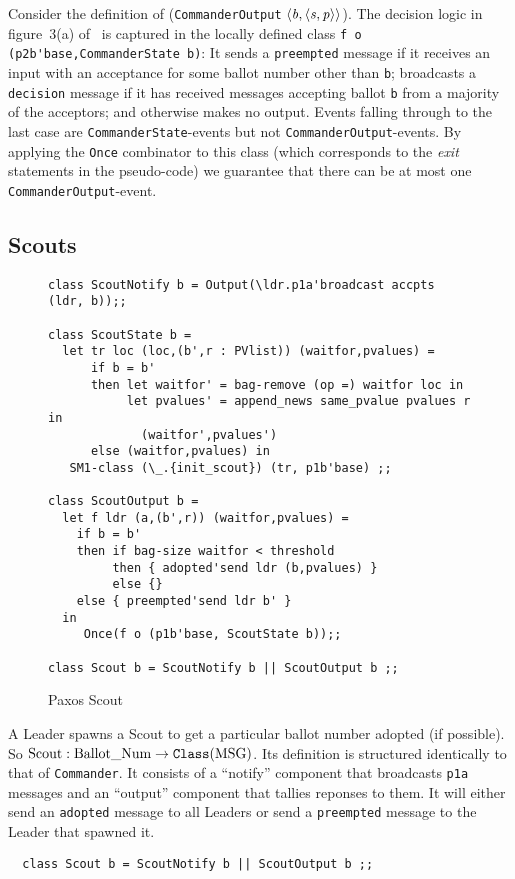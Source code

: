 \documentclass[final]{article}
\newcommand{\listinline}[1]{\text{\lstinline{#1}}}
\newcommand{\bsp}{\mbox{$\NUPRLpair{\NUPRL{b}}{\NUPRLpair{\NUPRL{s}}{\NUPRL{p}}}$}}
\begin{document}
Consider the definition of (\lstinline{CommanderOutput} \bsp).  The
decision logic in figure~3(a) of~\cite{VanRenesse:2011} is captured in
the locally defined class \lstinline{f o (p2b'base,CommanderState b)}:
It sends a \lstinline{preempted} message if it receives an input with
an acceptance for some ballot number other than \lstinline{b};
broadcasts a \lstinline{decision} message if it has received messages
accepting ballot \lstinline{b} from a majority of the acceptors; and
otherwise makes no output.  Events falling through to the last case
are \lstinline{CommanderState}-events but not
\lstinline{CommanderOutput}-events.  By applying the \lstinline{Once}
combinator to this class (which corresponds to the \emph{exit}
statements in the pseudo-code) we guarantee that there can be at most
one \lstinline{CommanderOutput}-event.

\subsection{Scouts}

\begin{figure}%
  \begin{lstlisting}[basicstyle=\small]
class ScoutNotify b = Output(\ldr.p1a'broadcast accpts (ldr, b));;

class ScoutState b =
  let tr loc (loc,(b',r : PVlist)) (waitfor,pvalues) =
      if b = b'
      then let waitfor' = bag-remove (op =) waitfor loc in
           let pvalues' = append_news same_pvalue pvalues r in
             (waitfor',pvalues')
      else (waitfor,pvalues) in
   SM1-class (\_.{init_scout}) (tr, p1b'base) ;;

class ScoutOutput b =
  let f ldr (a,(b',r)) (waitfor,pvalues) =
    if b = b'
    then if bag-size waitfor < threshold
         then { adopted'send ldr (b,pvalues) }
         else {}
    else { preempted'send ldr b' }
  in
     Once(f o (p1b'base, ScoutState b));;

class Scout b = ScoutNotify b || ScoutOutput b ;;
  \end{lstlisting}
  \caption{Paxos Scout}
  \label{fig:Paxos-Scout}
\end{figure}

A Leader spawns a Scout to get a particular ballot number adopted (if
possible).  So
$\listinline{Scout}:\NUPRLarrow{\listinline{Ballot_Num}}{\NUPRLclass{\listinline{MSG}}}$.
Its definition is structured identically to that of
\lstinline{Commander}.  It consists of a ``notify'' component that
broadcasts \lstinline{p1a} messages and an ``output'' component that
tallies reponses to them.  It will either send an \lstinline{adopted}
message to all Leaders or send a \lstinline{preempted} message to the
Leader that spawned it.
\begin{lstlisting}
  class Scout b = ScoutNotify b || ScoutOutput b ;;
\end{lstlisting}
\end{document}
